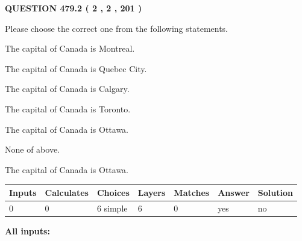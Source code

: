 \documentclass[12pt]{article}
\begin{document}
   
  
\vspace{0.2in}
  
{\textbf{\Large{QUESTION
479.2 
 ( 2 , 2 , 201 )
}}}
  
  
Please choose the correct one from the following statements.
 
 
The capital of Canada is Montreal.
 
 
The capital of Canada is Quebec City.
 
 
The capital of Canada is Calgary.
 
 
The capital of Canada is Toronto.
 
 
The capital of Canada is Ottawa.
 
 
 None of above.
 
 
\noindent{}
 
 
The capital of Canada is Ottawa.
 
 
\noindent{}
 
 
   
   
   
   
\noindent\begin{tabular}{|l|l|l|l|l|l|l|}
 \hline
Inputs & Calculates & Choices & Layers & Matches & Answer & Solution \\ \hline
 0  & 
 0  & 
 6
  simple  
  & 
 6  & 
 0  & 
  yes & 
  no 
  \\ \hline
 \end{tabular}
   
   
   
   
\noindent{}
   
   
   
   
\noindent\vspace{0.1in}\hspace{-0.08in} {\textbf{\Large{All inputs: }}}
   
   
   
   
   
   
 \vspace{0.2in}
 
   
   
\end{document}
